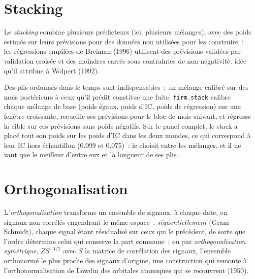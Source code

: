 \section{Stacking}

\begin{definition}[Stacking]\label{def:rs:signal-combination:stacking}
Le \emph{stacking} combine plusieurs prédicteurs (ici, plusieurs mélanges), avec des poids estimés sur leurs prévisions pour des données non utilisées pour
les construire~: les régressions empilées de Breiman (1996) utilisent des prévisions validées par validation croisée et des moindres carrés sous contraintes de
non-négativité, idée qu'il attribue à Wolpert (1992).
\end{definition}

Des plis ordonnés dans le temps sont indispensables~: un mélange calibré sur des mois postérieurs à ceux qu'il prédit constitue une fuite. \texttt{firm.stack} calibre chaque
mélange de base (poids égaux, poids d'IC, poids de régression) sur une fenêtre croissante, recueille ses prévisions pour le bloc de mois suivant, et
régresse la cible sur ces prévisions sans poids négatifs. Sur le panel complet, le stack a placé tout son poids sur les poids d'IC dans les deux mondes, ce qui correspond
à leur IC hors échantillon (0.099 et 0.075)~: le  choisit entre les mélanges, et il ne vaut que le meilleur d'entre eux et la longueur de ses
plis.

\section{Orthogonalisation}

\begin{definition}\label{def:rs:signal-combination:orth}
L'\emph{orthogonalisation} transforme un ensemble de signaux, à chaque date, en signaux non corrélés engendrant le même espace~:
\emph{séquentiellement} (Gram--Schmidt), chaque signal étant résidualisé sur ceux qui le précèdent, de sorte que l'ordre détermine celui qui conserve la part commune~; ou
par \emph{orthogonalisation symétrique}, $Z S^{-1/2}$ avec $S$ la matrice de corrélation des signaux, l'ensemble orthonormé
le plus proche des signaux d'origine, une construction qui remonte à l'orthonormalisation de Löwdin des orbitales atomiques qui se recouvrent (1950).
\end{definition}

